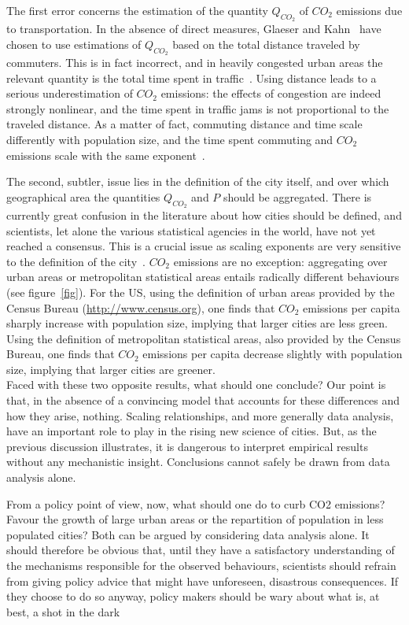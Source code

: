 The first error concerns the estimation of the quantity $Q_{CO_2}$ of $CO_2$ emissions due to
transportation. In the absence of direct measures, Glaeser and Kahn~\cite{Glaeser:2010} have chosen
to use estimations of $Q_{CO_2}$ based on the total distance traveled by commuters. This is in fact
incorrect, and in heavily congested urban areas the relevant quantity is the total time spent
in traffic~\cite{Louf:2013}. Using distance leads to a serious underestimation of
$CO_2$ emissions: the effects of congestion are indeed strongly nonlinear, and the time spent
in traffic jams is not proportional to the traveled distance. As a matter of fact, commuting
distance and time scale differently with population size, and the time spent commuting and
$CO_2$ emissions scale with the same exponent~\cite{Louf:2014}.

The second, subtler, issue lies in the definition of the city itself, and over which
geographical area the quantities $Q_{CO_2}$ and $P$ should be aggregated. There is currently great
confusion in the literature about how cities should be defined, and scientists, let alone the
various statistical agencies in the world, have not yet reached a consensus. This is a crucial
issue as scaling exponents are very sensitive to the definition of the city~\cite{Arcaute:2013}. $CO_2$ emissions are no exception: aggregating over urban areas or metropolitan
statistical areas entails radically different behaviours (see figure~\ref{fig}). For the US, using the
definition of urban areas provided by the Census Bureau (\url{http://www.census.org}), one finds
that $CO_2$ emissions per capita sharply increase with population size, implying that larger
cities are less green. Using the definition of metropolitan statistical areas, also provided by
the Census Bureau, one finds that $CO_2$ emissions per capita decrease slightly with population
size, implying that larger cities are greener.\\



Faced with these two opposite results, what should one conclude? Our point is that, in
the absence of a convincing model that accounts for these differences and how they arise,
nothing. Scaling relationships, and more generally data analysis, have an important role
to play in the rising new science of cities. But, as the previous discussion illustrates, it is
dangerous to interpret empirical results without any mechanistic insight. Conclusions cannot
safely be drawn from data analysis alone.

From a policy point of view, now, what should one do to curb CO2 emissions? Favour
the growth of large urban areas or the repartition of population in less populated cities?
Both can be argued by considering data analysis alone. It should therefore be obvious that,
until they have a satisfactory understanding of the mechanisms responsible for the observed
behaviours, scientists should refrain from giving policy advice that might have unforeseen,
disastrous consequences. If they choose to do so anyway, policy makers should be wary
about what is, at best, a shot in the dark

